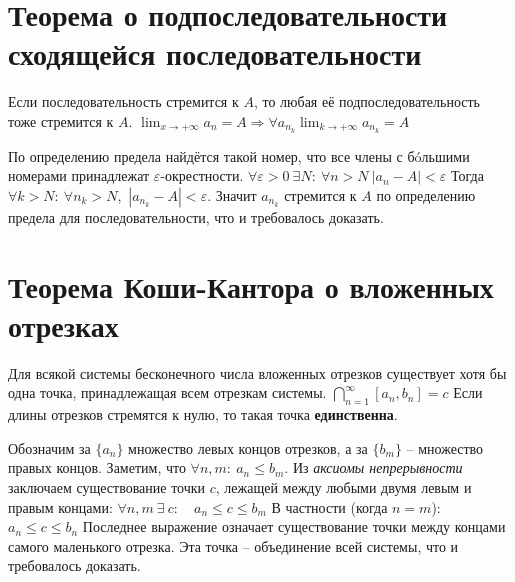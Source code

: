 \section[Т. о п/посл. сход. послед.]{Теорема о подпоследовательности сходящейся последовательности}
\begin{theorem}
Если последовательность стремится к $A$, то любая её подпоследовательность тоже стремится к $A$.\newline
$\displaystyle \lim_{x \to +\infty} a_n = A \Rightarrow \forall a_{n_k} \lim_{k \to +\infty} a_{n_k} = A$
\end{theorem}
По определению предела найдётся такой номер, что все члены с б\'oльшими номерами принадлежат $\varepsilon$-окрестности.
$\forall \varepsilon > 0\ \exists N:\ \forall n > N\ |a_n - A| < \varepsilon$\newline
Тогда $\forall k > N:\ \forall n_k > N$,\  $|a_{n_k} - A| < \varepsilon$.\newline
Значит $a_{n_k}$ стремится к $A$ по определению предела для последовательности, что и требовалось доказать.  

\section[Т. о влож. отрезках]{Теорема Коши-Кантора о вложенных отрезках}
\begin{theorem}
Для всякой системы бесконечного числа вложенных отрезков существует хотя бы одна точка, принадлежащая всем отрезкам системы.\newline
$\bigcap\limits_{n=1}^{\infty} [a_n, b_n] = c$\newline
Если длины отрезков стремятся к нулю, то такая точка \textbf{единственна}.
\end{theorem}
Обозначим за $\{ a_n\}$ множество левых концов отрезков, а за $\{ b_m \}$ -- множество правых концов.
Заметим, что $\forall n, m:\ a_n \leq b_m$. Из \textit{аксиомы непрерывности} заключаем существование точки $c$, лежащей между любыми двумя левым и правым концами:\newline
$\forall n, m\ \exists\  c: \quad a_n \leq c \leq b_m$\newline
В частности (когда $n = m$): $a_n \leq c \leq b_n$\newline 
Последнее выражение означает существование точки между концами самого маленького отрезка. Эта точка -- объединение всей системы, что и требовалось доказать.\newline\newline


